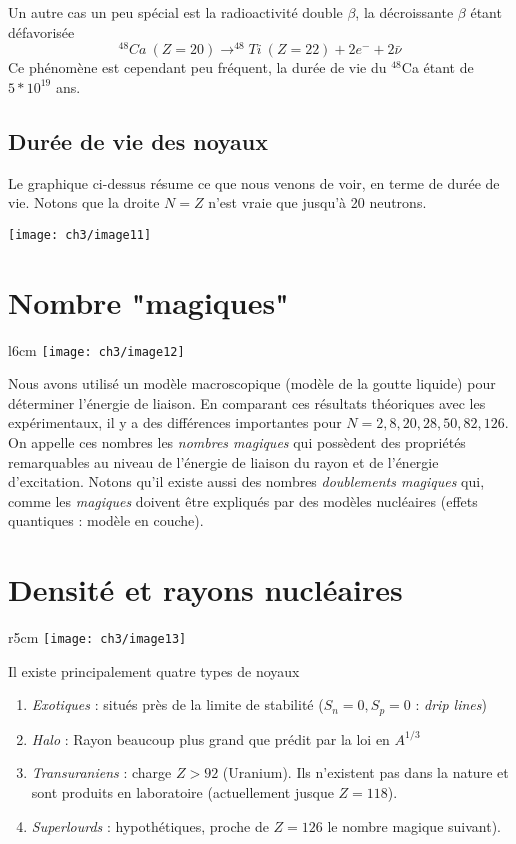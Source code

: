 Un autre cas un peu spécial est la radioactivité double $\beta$, la décroissante $\beta$ étant défavorisée
\begin{equation}
^{48}Ca\ (Z=20) \to ^{48}Ti\ (Z=22) + 2e^- + 2\bar\nu
\end{equation}
Ce phénomène est cependant peu fréquent, la durée de vie du $^{48}$Ca étant de $5*10^{19}$ ans. 

\subsection{Durée de vie des noyaux}
Le graphique ci-dessus résume ce que nous venons de voir, en terme de durée de vie. Notons que la droite
$N=Z$ n'est vraie que jusqu'à 20 neutrons.
\newpage
\begin{center}
	\texttt{[image: ch3/image11]}
\end{center}

\section{Nombre "magiques"}
	\begin{wrapfigure}[11]{l}{6cm}
	\texttt{[image: ch3/image12]}
	\end{wrapfigure} 
Nous avons utilisé un modèle macroscopique (modèle de la goutte liquide) pour déterminer l'énergie de liaison. 
En comparant ces résultats théoriques avec les expérimentaux, il y a des différences importantes pour 
$N=2,8,20,28,50,82,126$. On appelle ces nombres les \textit{nombres magiques} qui possèdent des propriétés 
remarquables au niveau de l'énergie de liaison du rayon et de l'énergie d'excitation. Notons qu'il existe
aussi des nombres \textit{doublements magiques} qui, comme les \textit{magiques} doivent être expliqués par 
des modèles nucléaires (effets quantiques : modèle en couche).


\section{Densité et rayons nucléaires}
	\begin{wrapfigure}[11]{r}{5cm}
	\texttt{[image: ch3/image13]}
	\end{wrapfigure}
Il existe principalement quatre types de noyaux
\begin{enumerate}
\item \textit{Exotiques} : situés près de la limite de stabilité ($S_n=0,S_p=0$ : \textit{drip lines})
\item \textit{Halo} : Rayon beaucoup plus grand que prédit par la loi en $A^{1/3}$
\item \textit{Transuraniens} : charge $Z > 92$ (Uranium). Ils n'existent pas dans la nature et sont produits
en laboratoire (actuellement jusque $Z=118$).
\item \textit{Superlourds} : hypothétiques, proche de $Z=126$ le nombre magique suivant).
\end{enumerate}

